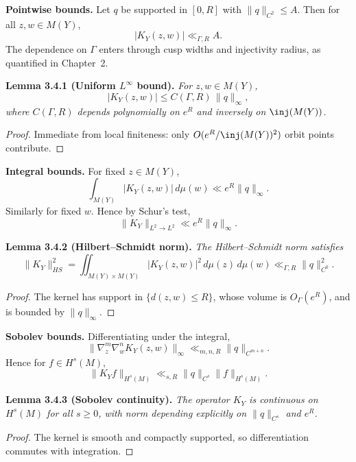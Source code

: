 \medskip

\noindent\textbf{Pointwise bounds.}
Let $q$ be supported in $[0,R]$ with $\|q\|_{C^{2}}\le A$.
Then for all $z,w\in M(Y)$,
\[
  |K_{Y}(z,w)| \ll_{\Gamma,R} A.
\]
The dependence on $\Gamma$ enters through cusp widths and injectivity radius,
as quantified in Chapter~2.

\medskip

\noindent\textbf{Lemma 3.4.1 (Uniform $L^{\infty}$ bound).}
\emph{For $z,w\in M(Y)$,
\[
  |K_{Y}(z,w)| \le C(\Gamma,R)\,\|q\|_{\infty},
\]
where $C(\Gamma,R)$ depends polynomially on $e^{R}$ and inversely on $\inj(M(Y))$.}

\begin{proof}
Immediate from local finiteness:
only $O(e^{R}/\inj(M(Y))^{2})$ orbit points contribute.
\end{proof}

\medskip

\noindent\textbf{Integral bounds.}
For fixed $z\in M(Y)$,
\[
  \int_{M(Y)} |K_{Y}(z,w)|\,d\mu(w) \ll e^{R}\|q\|_{\infty}.
\]
Similarly for fixed $w$.
Hence by Schur’s test,
\[
  \|K_{Y}\|_{L^{2}\to L^{2}} \ll e^{R}\|q\|_{\infty}.
\]

\medskip

\noindent\textbf{Lemma 3.4.2 (Hilbert–Schmidt norm).}
\emph{The Hilbert–Schmidt norm satisfies
\[
  \|K_{Y}\|_{HS}^{2} = \iint_{M(Y)\times M(Y)} |K_{Y}(z,w)|^{2}\,d\mu(z)\,d\mu(w)
  \ll_{\Gamma,R} \|q\|_{C^{0}}^{2}.
\]}

\begin{proof}
The kernel has support in $\{d(z,w)\le R\}$,
whose volume is $O_{\Gamma}(e^{R})$,
and is bounded by $\|q\|_{\infty}$.
\end{proof}

\medskip

\noindent\textbf{Sobolev bounds.}
Differentiating under the integral,
\[
  \|\nabla_{z}^{m}\nabla_{w}^{n} K_{Y}(z,w)\|_{\infty}
  \ll_{m,n,R} \|q\|_{C^{m+n}}.
\]
Hence for $f\in H^{s}(M)$,
\[
  \|K_{Y}f\|_{H^{s}(M)} \ll_{s,R} \|q\|_{C^{s}} \|f\|_{H^{s}(M)}.
\]

\medskip

\noindent\textbf{Lemma 3.4.3 (Sobolev continuity).}
\emph{The operator $K_{Y}$ is continuous on $H^{s}(M)$ for all $s\ge 0$,
with norm depending explicitly on $\|q\|_{C^{s}}$ and $e^{R}$.}

\begin{proof}
The kernel is smooth and compactly supported,
so differentiation commutes with integration.
\end{proof}

